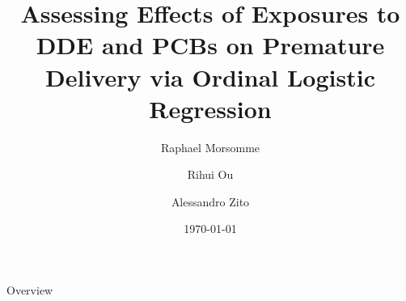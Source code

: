 \documentclass{beamer}\usepackage[]{graphicx}\usepackage[]{color}
\title[DDE and PCB effect on Premature delivery]{Assessing Effects of Exposures to DDE and PCBs on Premature Delivery via Ordinal Logistic Regression}
\author[Morsomme, Ou, Zito]{Raphael Morsomme \and Rihui Ou \and Alessandro Zito}
\institute[Stat 723]{Case Study 1- Stat 723}
\date{\today}
\makeatletter
\def\maxwidth{ %
  \ifdim\Gin@nat@width>\linewidth
    \linewidth
  \else
    \Gin@nat@width
  \fi
}
\newenvironment{knitrout}{}{} %
\makeatother
\begin{document}

\begin{frame}
\titlepage
\end{frame}

\begin{frame}{Overview}
\tableofcontents
\end{frame}

\end{document}

